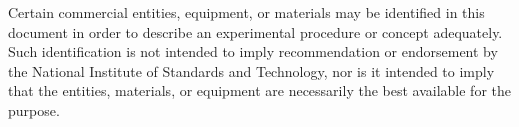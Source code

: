 \begin{titlepage}
        \begin{flushleft}
            \footnotesize  Certain commercial entities, equipment, or materials may be identified in this document in order to describe an experimental procedure or concept adequately. Such identification is not intended to imply recommendation or endorsement by the National Institute of Standards and Technology, nor is it intended to imply that the entities, materials, or equipment are necessarily the best available for the purpose.\\ 

\end{flushleft}
\end{titlepage}
